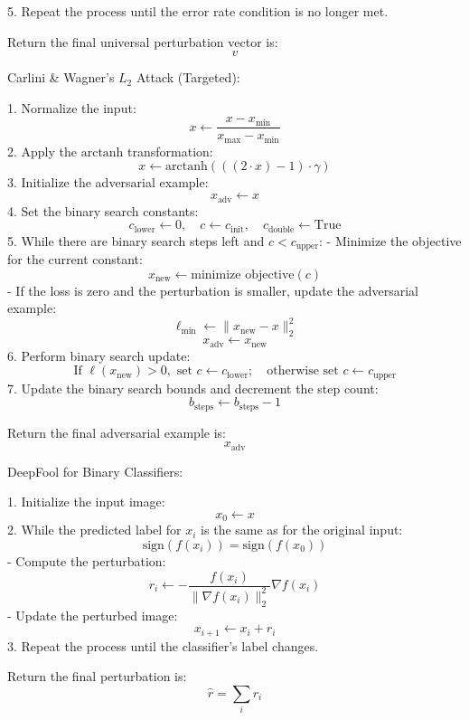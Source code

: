 5. Repeat the process until the error rate condition is no longer met.

Return the final universal perturbation vector is:
\[
v
\]

Carlini \& Wagner's $L_2$ Attack (Targeted):

1. Normalize the input:
\[
x \leftarrow \frac{x - x_{\text{min}}}{x_{\text{max}} - x_{\text{min}}}
\]
2. Apply the $\text{arctanh}$ transformation:
\[
x \leftarrow \text{arctanh}\left( ((2 \cdot x) - 1) \cdot \gamma \right)
\]
3. Initialize the adversarial example:
\[
x_{\text{adv}} \leftarrow x
\]
4. Set the binary search constants:
\[
c_{\text{lower}} \leftarrow 0, \quad c \leftarrow c_{\text{init}}, \quad c_{\text{double}} \leftarrow \text{True}
\]
5. While there are binary search steps left and $c < c_{\text{upper}}$:
    - Minimize the objective for the current constant:
    \[
    x_{\text{new}} \leftarrow \text{minimize objective}(c)
    \]
    - If the loss is zero and the perturbation is smaller, update the adversarial example:
    \[
    \ell_{\text{min}} \leftarrow \|x_{\text{new}} - x\|_2^2
    \]
    \[
    x_{\text{adv}} \leftarrow x_{\text{new}}
    \]
6. Perform binary search update:
    \[
    \text{If } \ell(x_{\text{new}}) > 0, \text{ set } c \leftarrow c_{\text{lower}}; \quad \text{otherwise set } c \leftarrow c_{\text{upper}}
    \]
7. Update the binary search bounds and decrement the step count:
    \[
    b_{\text{steps}} \leftarrow b_{\text{steps}} - 1
    \]

Return the final adversarial example is:
\[
x_{\text{adv}}
\]

DeepFool for Binary Classifiers:

1. Initialize the input image:
\[
x_0 \leftarrow x
\]
2. While the predicted label for $x_i$ is the same as for the original input:
\[
\text{sign}(f(x_i)) = \text{sign}(f(x_0))
\]
    - Compute the perturbation:
    \[
    r_i \leftarrow - \frac{f(x_i)}{\|\nabla f(x_i)\|_2^2} \nabla f(x_i)
    \]
    - Update the perturbed image:
    \[
    x_{i+1} \leftarrow x_i + r_i
    \]
3. Repeat the process until the classifier’s label changes.

Return the final perturbation is:
\[
\hat{r} = \sum_i r_i
\]


